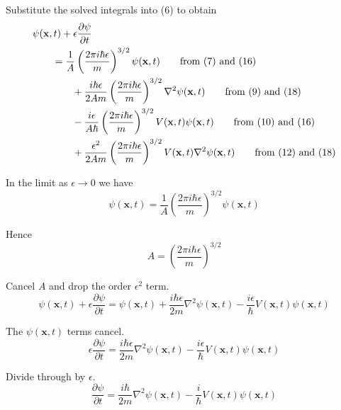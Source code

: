 \documentclass[12pt]{article}
\begin{document}
Substitute the solved integrals into (6) to obtain
\begin{align*}
&\psi(\mathbf{x},t)+\epsilon\frac{\partial\psi}{\partial t}
\\
&\qquad{}=\frac{1}{A}\left(\frac{2\pi i\hbar\epsilon}{m}\right)^{3/2}\psi(\mathbf x,t)
\tag*{\text{from (7) and (16)}}
\\
&\qquad\qquad{}+\frac{i\hbar\epsilon}{2Am}\left(\frac{2\pi i\hbar\epsilon}{m}\right)^{3/2}\nabla^2\psi(\mathbf x,t)
\tag*{\text{from (9) and (18)}}
\\
&\qquad\qquad{}-\frac{i\epsilon}{A\hbar}\left(\frac{2\pi i\hbar\epsilon}{m}\right)^{3/2}V(\mathbf x,t)\psi(\mathbf x,t)
\tag*{\text{from (10) and (16)}}
\\
&\qquad\qquad{}+\frac{\epsilon^2}{2Am}\left(\frac{2\pi i\hbar\epsilon}{m}\right)^{3/2}
V(\mathbf x,t)\nabla^2\psi(\mathbf x,t)
\tag*{\text{from (12) and (18)}}
\end{align*}

In the limit as $\epsilon\rightarrow0$ we have
\begin{equation*}
\psi(\mathbf{x},t)=\frac{1}{A}\left(\frac{2\pi i\hbar\epsilon}{m}\right)^{3/2}\psi(\mathbf x,t)
\end{equation*}

Hence
\begin{equation*}
A=\left(\frac{2\pi i\hbar\epsilon}{m}\right)^{3/2}
\end{equation*}

Cancel $A$ and drop the order $\epsilon^2$ term.
\begin{equation*}
\psi(\mathbf{x},t)+\epsilon\frac{\partial\psi}{\partial t}
=\psi(\mathbf{x},t)
+\frac{i\hbar\epsilon}{2m}\nabla^2\psi(\mathbf{x},t)
-\frac{i\epsilon}{\hbar}V(\mathbf x,t)\psi(\mathbf{x},t)
\end{equation*}

The $\psi(\mathbf x,t)$ terms cancel.
\begin{equation*}
\epsilon\frac{\partial\psi}{\partial t}
=\frac{i\hbar\epsilon}{2m}\nabla^2\psi(\mathbf{x},t)
-\frac{i\epsilon}{\hbar}V(\mathbf x,t)\psi(\mathbf{x},t)
\end{equation*}

Divide through by $\epsilon$.
\begin{equation*}
\frac{\partial\psi}{\partial t}
=\frac{i\hbar}{2m}\nabla^2\psi(\mathbf{x},t)
-\frac{i}{\hbar}V(\mathbf x,t)\psi(\mathbf{x},t)
\end{equation*}
\end{document}

